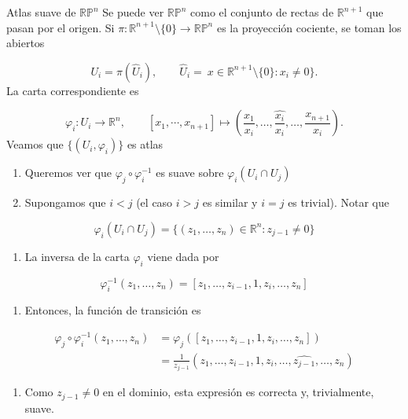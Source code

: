 \begin{bookexample}{Atlas suave de $\mathbb{RP}^n$}
Se puede ver $\mathbb{RP}^n$ como el conjunto de rectas de $\mathbb{R}^{n+1}$ que pasan por el origen. Si $\pi:\mathbb{R}^{n+1}\setminus\{0\}\to\mathbb{RP}^n$ es la proyección cociente, se toman los abiertos

\[
U_i=\pi(\widehat{U}_i),\qquad \widehat{U}_i=\ x\in\mathbb{R}^{n+1}\setminus\{0\}:x_i\neq 0\}.
\]
La carta correspondiente es

\[
\varphi_i:U_i\to\mathbb{R}^n,\qquad[x_1,\cdots,x_{n+1}]\mapsto\left(\frac{x_1}{x_i},\dots,\widehat{\frac{x_i}{x_i}},\dots,\frac{x_{n+1}}{x_i}\right).
\]
Veamos que $\{ (U_{i},\varphi_{i}) \}$ es atlas

\end{bookexample}
\begin{bookproof}{}
\begin{enumerate}
\item Queremos ver que $\varphi_j \circ \varphi_i^{-1}$ es suave sobre $\varphi_i(U_i \cap U_j)$
\item Supongamos que $i < j$ (el caso $i > j$ es similar y $i=j$ es trivial). Notar que
\end{enumerate}
\[
\varphi_i(U_i \cap U_j) = \{ (z_1, \dots, z_n) \in \mathbb{R}^n : z_{j-1} \neq 0 \}
\]
\begin{enumerate}[start=3]
\item La inversa de la carta $\varphi_i$ viene dada por
\end{enumerate}
\[
\varphi_i^{-1}(z_1, \dots, z_n) = [z_1 , \dots , z_{i-1} , 1 , z_i , \dots , z_n]
\]
\begin{enumerate}[start=4]
\item Entonces, la función de transición es
\end{enumerate}
\[
\begin{aligned}\varphi_j \circ \varphi_i^{-1}(z_1, \dots, z_n) &= \varphi_j ([z_1 , \dots , z_{i-1} , 1 , z_i , \dots ,z_n]) \\&= \frac{1}{z_{j-1}} (z_1, \dots, z_{i-1}, 1, z_i, \dots, \widehat{z_{j-1}}, \dots, z_n)\end{aligned}
\]
\begin{enumerate}[start=5]
\item Como $z_{j-1} \neq 0$ en el dominio, esta expresión es correcta y, trivialmente, suave.
\end{enumerate}
\bookqed
\end{bookproof}
